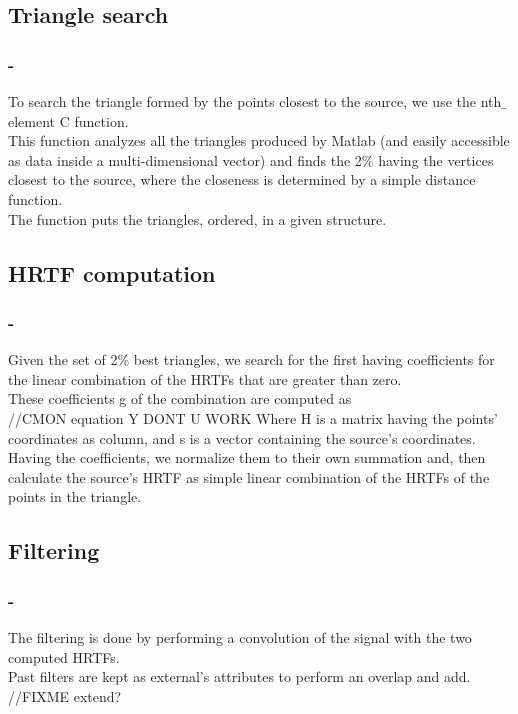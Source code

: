 \documentclass{beamer}
\begin{document}
	\subsection{Triangle search}

	\begin{frame}
		\frametitle{\insertsection - \insertsubsection}
		To search the triangle formed by the points closest to the source, we use the nth$\_$element C function.\\
		This function analyzes all the triangles produced by Matlab (and easily accessible as data inside a
		multi-dimensional vector) and finds the 2\% having the vertices closest to the source, where the closeness is
		determined by a simple distance function.\\
		The function puts the triangles, ordered, in a given structure.\\
	\end{frame}
	
	\subsection{HRTF computation}

	\begin{frame}
		\frametitle{\insertsection - \insertsubsection}
		Given the set of 2\% best triangles, we search for the first having coefficients for the linear combination of
		the HRTFs that are greater than zero.\\
		These coefficients g of the combination are computed as\\
		//CMON equation Y DONT U WORK
		Where H is a matrix having the points' coordinates as column, and s is a vector containing the source's
		coordinates.\\
		Having the coefficients, we normalize them to their own summation and, then calculate the source's HRTF as simple
		linear combination of the HRTFs of the points in the triangle.\\
	\end{frame}
	
	\subsection{Filtering}

	\begin{frame}
		\frametitle{\insertsection - \insertsubsection}
		The filtering is done by performing a convolution of the signal with the two computed HRTFs.\\
		Past filters are kept as external's attributes to perform an overlap and add.\\
		//FIXME extend?
	\end{frame}
\end{document}

